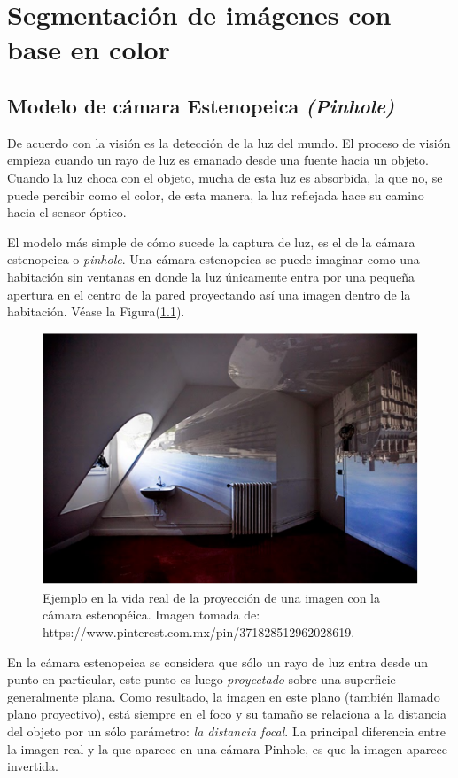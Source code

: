 \chapter{Segmentación de imágenes con base en color}
	\section{Modelo de cámara Estenopeica \textit{(Pinhole)}}

De acuerdo con \cite{bradski2008learning} la visión es la detección de la luz del mundo. El proceso de visión empieza cuando un rayo de luz es emanado desde una fuente hacia un objeto. Cuando la luz choca con el objeto, mucha de esta luz es absorbida, la que no, se puede percibir como el color, de esta manera, la luz reflejada hace su camino hacia el sensor óptico.

El modelo más simple de cómo sucede la captura de luz, es el de la cámara estenopeica o \textit{pinhole}. Una cámara estenopeica se puede imaginar como una habitación sin ventanas en donde la luz únicamente entra por una pequeña apertura en el centro de la pared proyectando así una imagen dentro de la habitación. Véase la Figura(\ref{fig:pinholeCamera}).

\begin{figure}
	\centering		
	\includegraphics[scale=0.7]{images/pinholeCamera.pdf}
	\caption{Ejemplo en la vida real de la proyección de una imagen con la cámara estenopéica. Imagen tomada de: https://www.pinterest.com.mx/pin/371828512962028619.}		
	\label{fig:pinholeCamera}
\end{figure}

En la cámara estenopeica se considera que sólo un rayo de luz entra desde un punto en particular, este punto es luego \textit{proyectado} sobre una superficie generalmente plana. Como resultado, la imagen en este plano (también llamado plano proyectivo), está siempre en el foco y su tamaño se relaciona a la distancia del objeto por un sólo parámetro: \textit{la distancia focal}. La principal diferencia entre la imagen real y la que aparece en una cámara Pinhole, es que la imagen aparece invertida. 
	
